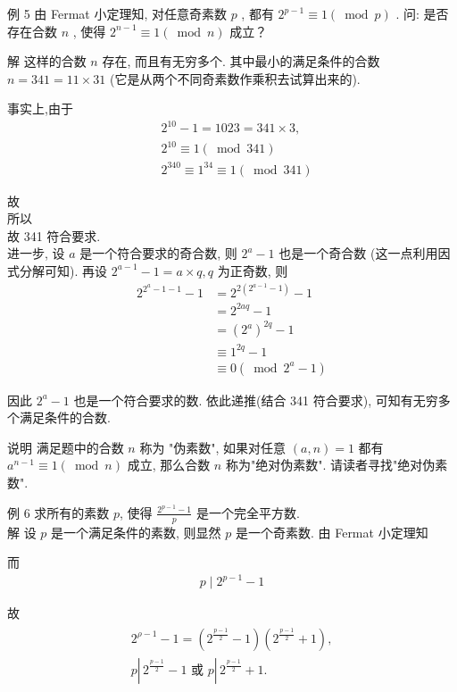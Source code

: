 	例 5 由 Fermat 小定理知, 对任意奇素数 $p$ , 都有 $2^{p-1} \equiv 1(\bmod p)$ . 问: 是否存在合数 $n$ , 使得 $2^{n-1} \equiv 1(\bmod n)$ 成立？

	解 这样的合数 $n$ 存在, 而且有无穷多个. 其中最小的满足条件的合数 $n=341=11 \times 31$ (它是从两个不同奇素数作乘积去试算出来的).

	事实上,由于\begin{align}
		 & 2^{10}-1=1023=341 \times 3,               \\
		 & 2^{10} \equiv 1(\bmod 341)                \\
		 & 2^{340} \equiv 1^{34} \equiv 1(\bmod 341)
	\end{align}

	故\\
	所以\\
	故 341 符合要求.\\
	进一步, 设 $a$ 是一个符合要求的奇合数, 则 $2^{a}-1$ 也是一个奇合数 (这一点利用因式分解可知). 再设 $2^{a-1}-1=a \times q, q$ 为正奇数, 则\begin{align}
		2^{2^{a}-1-1}-1 & =2^{2\left(2^{a-1}-1\right)}-1     \\
		                & =2^{2 a q}-1                       \\
		                & =\left(2^{a}\right)^{2 q}-1        \\
		                & \equiv 1^{2 q}-1                   \\
		                & \equiv 0\left(\bmod 2^{a}-1\right)
	\end{align}

	因此 $2^{a}-1$ 也是一个符合要求的数. 依此递推(结合 341 符合要求), 可知有无穷多个满足条件的合数.

	说明 满足题中的合数 $n$ 称为 "伪素数", 如果对任意 $(a, n)=1$ 都有 $a^{n-1} \equiv 1(\bmod n)$ 成立, 那么合数 $n$ 称为"绝对伪素数". 请读者寻找"绝对伪素数".

	例 6 求所有的素数 $p$, 使得 $\frac{2^{p-1}-1}{p}$ 是一个完全平方数. \\
	解 设 $p$ 是一个满足条件的素数, 则显然 $p$ 是一个奇素数. 由 Fermat 小定理知

	而
	\begin{align*}
		p \mid 2^{p-1}-1
	\end{align*}

	故
	\begin{align*}
		\begin{gathered}
			2^{\rho-1}-1=\left(2^{\frac{p-1}{2}}-1\right)\left(2^{\frac{p-1}{2}}+1\right), \\
			p \left\lvert\, 2^{\frac{p-1}{2}}-1\right. \text { 或 } p \left\lvert\, 2^{\frac{p-1}{2}}+1 .\right.
		\end{gathered}
	\end{align*}

